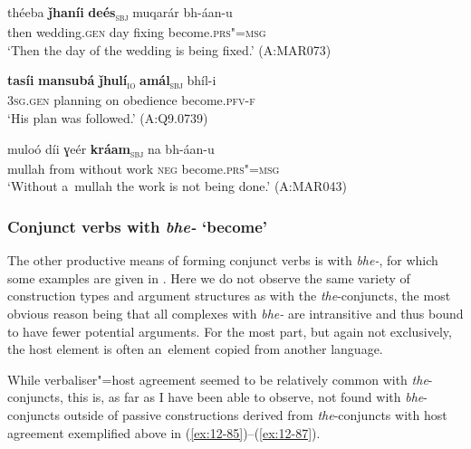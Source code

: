 \begin{exe}
\ex
\label{ex:12-85}
\gll théeba {\ob}\textbf{ǰhaníi} \textbf{deés}{\cb}\textsubscript{\textsc{\upshape sbj}} muqarár bh-áan-u\\
then wedding.\textsc{gen} day fixing become.\textsc{prs"=msg} \\
\glt `Then the day of the wedding is being fixed.' (A:MAR073)
\end{exe}
\begin{exe}
\ex
\label{ex:12-86}
\gll {\ob}\textbf{tasíi} \textbf{mansubá} \textbf{ǰhulí}{\cb}\textsubscript{\textsc{\upshape io}} {\ob}\textbf{amál}{\cb}\textsubscript{\textsc{\upshape sbj}} bhíl-i\\
\textsc{3sg.gen} planning on obedience become.\textsc{pfv-f}\\
\glt `His plan was followed.' (A:Q9.0739)
\end{exe}
\begin{exe}
\ex
\label{ex:12-87}
\gll muloó díi ɣeér {\ob}\textbf{kráam}{\cb}\textsubscript{\textsc{\upshape sbj}} na bh-áan-u\\
mullah from without work \textsc{neg} become.\textsc{prs"=msg}\\
\glt `Without a~mullah the work is not being done.' (A:MAR043)
\end{exe}

\subsubsection*{Conjunct verbs with \textit{bhe-} `become'}

The other productive means of forming conjunct verbs is with \textit{bhe-}, for which some examples are given in . Here we do not observe the same variety of construction types and argument structures as with the \textit{the}-conjuncts, the most obvious reason being that all complexes with \textit{bhe-} are intransitive and thus bound to have fewer potential arguments. For the most part, but again not exclusively, the host element is often an~element copied from another language. 


While verbaliser"=host agreement seemed to be relatively common with \textit{the}-conjuncts, this is, as far as I have been able to observe, not found with \textit{bhe}-conjuncts outside of passive constructions derived from \textit{the}-conjuncts with host agreement exemplified above in (\ref{ex:12-85})--(\ref{ex:12-87}). 


